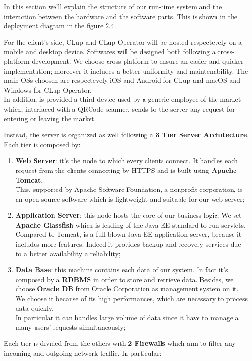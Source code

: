 In this section we'll explain the structure of our run-time system and the interaction between the hardware and the software parts. This is shown in the deployment diagram in the figure 2.4. \bigskip

For the client's side, CLup and CLup Operator will be hosted respectevely on a mobile and desktop device. Softwares will be designed both following a cross-platform development. 
We choose cross-platform to ensure an easier and quicker implementation; moreover it includes a better uniformity and maintenability.   
The main OSs choosen are respectevely iOS and Android for CLup and macOS and Windows for CLup Operator.\\
In addition is provided a third device used by a generic employee of the market which, interfaced with a QRCode scanner, sends to the server any request for entering or leaving  the market. \pagebreak

Instead, the server is organized as well following a \textbf{3 Tier Server Architecture}. Each tier is composed by:

\begin{enumerate}
\item \textbf{Web Server}: it's the node to which every clients connect. It handles each request from the clients connecting by HTTPS and is built using \textbf{Apache Tomcat}. \\
This, supported by Apache Software Foundation, a nonprofit corporation, is an open source software which is lightweight and suitable for our web server;
\item \textbf{Application Server}: this node hosts the core of our business logic. We set \textbf{Apache Glassfish} which is leading of the Java EE standard to run servlets. Compared to Tomcat, is a full-blown Java EE application server, because it includes more features. Indeed it provides backup and recovery services due to a better availability a reliability;

\item \textbf{Data Base}: this machine contains each data of our system. In fact it's composed by a \textbf{RDBMS} in order to store and retrieve data. Besides, we choose \textbf{Oracle DB} from Oracle Corporation as management system on it. We choose it because of its high performances, which are necessary to process data quickly. \\
In particular it can handles large volume of data since it have to manage a many users' requests simultaneously;
\end{enumerate}
\bigskip
Each tier is divided from the others with \textbf{2 Firewalls} which aim to filter any incoming and outgoing network traffic.
In particular:

